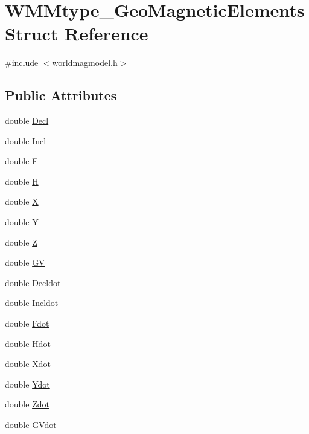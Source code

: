 \hypertarget{struct_w_m_mtype___geo_magnetic_elements}{\section{\-W\-M\-Mtype\-\_\-\-Geo\-Magnetic\-Elements \-Struct \-Reference}
\label{struct_w_m_mtype___geo_magnetic_elements}
}


{\ttfamily \#include $<$worldmagmodel.\-h$>$}

\subsection*{\-Public \-Attributes}
\begin{DoxyCompactItemize}
\item 
double \hyperlink{struct_w_m_mtype___geo_magnetic_elements_a683f5cce0a61ae941ac21ac3245b590a}{\-Decl}
\item 
double \hyperlink{struct_w_m_mtype___geo_magnetic_elements_a4a892ce94600018b364ef34e8416861c}{\-Incl}
\item 
double \hyperlink{struct_w_m_mtype___geo_magnetic_elements_a4c99b8d3e3432fca01948041425f1123}{\-F}
\item 
double \hyperlink{struct_w_m_mtype___geo_magnetic_elements_a0481f463d3ac0e7d7638edd1293955ed}{\-H}
\item 
double \hyperlink{struct_w_m_mtype___geo_magnetic_elements_aa8c06cae11ef4891bf6d43eaeb7787d5}{\-X}
\item 
double \hyperlink{struct_w_m_mtype___geo_magnetic_elements_a0b311ece921afc948e5e8dda01f7584a}{\-Y}
\item 
double \hyperlink{struct_w_m_mtype___geo_magnetic_elements_a989cffa7f071bb16f17a2be007dd5419}{\-Z}
\item 
double \hyperlink{struct_w_m_mtype___geo_magnetic_elements_a384032e354879712c50bee2ffef663c2}{\-G\-V}
\item 
double \hyperlink{struct_w_m_mtype___geo_magnetic_elements_ac37defec32ce23551b0d787961d5e615}{\-Decldot}
\item 
double \hyperlink{struct_w_m_mtype___geo_magnetic_elements_ad42b26463a764fbbe5fa6fe815d81f00}{\-Incldot}
\item 
double \hyperlink{struct_w_m_mtype___geo_magnetic_elements_a9a1465364de801ea9a6567f63aeddff7}{\-Fdot}
\item 
double \hyperlink{struct_w_m_mtype___geo_magnetic_elements_a4f48837b7b954edff150a6994ff80720}{\-Hdot}
\item 
double \hyperlink{struct_w_m_mtype___geo_magnetic_elements_a98363bfa933b65aae742479e14dc209a}{\-Xdot}
\item 
double \hyperlink{struct_w_m_mtype___geo_magnetic_elements_aaecfb6ce93c718489c1d0982d43d56b6}{\-Ydot}
\item 
double \hyperlink{struct_w_m_mtype___geo_magnetic_elements_a105c49de1702144d115e20ba6272a2c6}{\-Zdot}
\item 
double \hyperlink{struct_w_m_mtype___geo_magnetic_elements_abd5895b4add30e1d0a36e0b86ab9af22}{\-G\-Vdot}
\end{DoxyCompactItemize}


